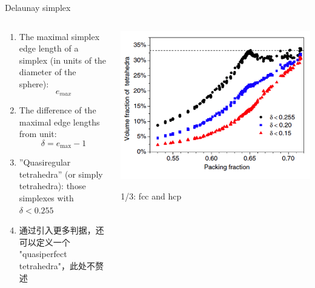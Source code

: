 \documentclass{bredelebeamer}
\begin{document}
\begin{frame}{Delaunay simplex}
\begin{columns}
\begin{column}{0.5\textwidth}
\begin{enumerate}[]
\item The maximal simplex edge length of a simplex (in units of the diameter of the sphere): $$e_{max}$$
\item The difference of the maximal edge lengths from unit: $$\delta=e_{\max }-1$$
\item ''Quasiregular tetrahedra'' (or simply tetrahedra): those simplexes with $\delta <0.255$
\item 通过引入更多判据，还可以定义一个 "quasiperfect tetrahedra"，此处不赘述
\end{enumerate}
\end{column}

\begin{column}{0.5\textwidth}
\centerline{\includegraphics[scale=0.2]{images/pp4.png}}
\centerline{1/3: fcc and hcp}
\end{column}
\end{columns}
\end{frame}
\end{document}
